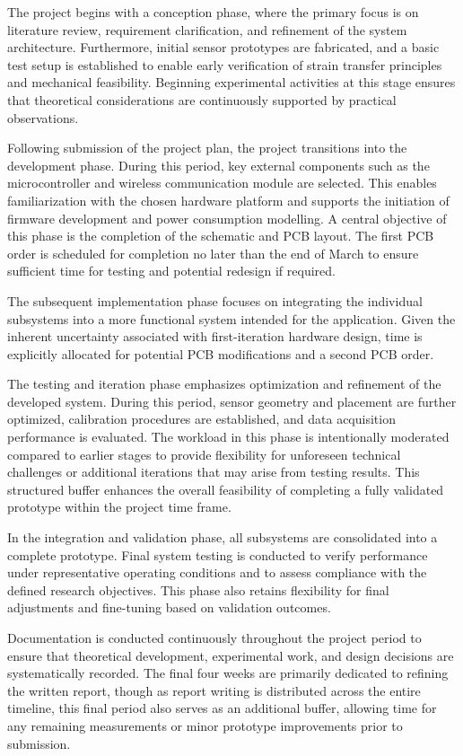 The project begins with a conception phase, where the primary focus is on literature review, requirement clarification, and refinement of the system architecture. Furthermore, initial sensor prototypes are fabricated, and a basic test setup is established to enable early verification of strain transfer principles and mechanical feasibility. Beginning experimental activities at this stage ensures that theoretical considerations are continuously supported by practical observations.

Following submission of the project plan, the project transitions into the development phase. During this period, key external components such as the microcontroller and wireless communication module are selected. This enables familiarization with the chosen hardware platform and supports the initiation of firmware development and power consumption modelling. A central objective of this phase is the completion of the schematic and PCB layout. The first PCB order is scheduled for completion no later than the end of March to ensure sufficient time for testing and potential redesign if required.

The subsequent implementation phase focuses on integrating the individual subsystems into a more functional system intended for the application. Given the inherent uncertainty associated with first-iteration hardware design, time is explicitly allocated for potential PCB modifications and a second PCB order.

The testing and iteration phase emphasizes optimization and refinement of the developed system. During this period, sensor geometry and placement are further optimized, calibration procedures are established, and data acquisition performance is evaluated. The workload in this phase is intentionally moderated compared to earlier stages to provide flexibility for unforeseen technical challenges or additional iterations that may arise from testing results. This structured buffer enhances the overall feasibility of completing a fully validated prototype within the project time frame.

In the integration and validation phase, all subsystems are consolidated into a complete prototype. Final system testing is conducted to verify performance under representative operating conditions and to assess compliance with the defined research objectives. This phase also retains flexibility for final adjustments and fine-tuning based on validation outcomes.

Documentation is conducted continuously throughout the project period to ensure that theoretical development, experimental work, and design decisions are systematically recorded. The final four weeks are primarily dedicated to refining the written report, though as report writing is distributed across the entire timeline, this final period also serves as an additional buffer, allowing time for any remaining measurements or minor prototype improvements prior to submission.


